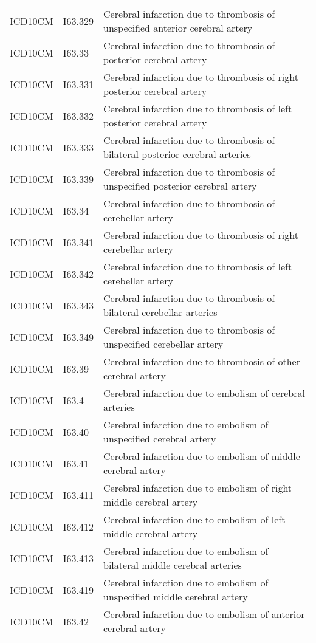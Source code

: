 \begin{longtable}{p{}p{}p{}}
  ICD10CM & I63.329 & Cerebral infarction due to thrombosis of unspecified anterior cerebral artery \\ 
  ICD10CM & I63.33 & Cerebral infarction due to thrombosis of posterior cerebral artery \\ 
  ICD10CM & I63.331 & Cerebral infarction due to thrombosis of right posterior cerebral artery \\ 
  ICD10CM & I63.332 & Cerebral infarction due to thrombosis of left posterior cerebral artery \\ 
  ICD10CM & I63.333 & Cerebral infarction due to thrombosis of bilateral posterior cerebral arteries \\ 
  ICD10CM & I63.339 & Cerebral infarction due to thrombosis of unspecified posterior cerebral artery \\ 
  ICD10CM & I63.34 & Cerebral infarction due to thrombosis of cerebellar artery \\ 
  ICD10CM & I63.341 & Cerebral infarction due to thrombosis of right cerebellar artery \\ 
  ICD10CM & I63.342 & Cerebral infarction due to thrombosis of left cerebellar artery \\ 
  ICD10CM & I63.343 & Cerebral infarction due to thrombosis of bilateral cerebellar arteries \\ 
  ICD10CM & I63.349 & Cerebral infarction due to thrombosis of unspecified cerebellar artery \\ 
  ICD10CM & I63.39 & Cerebral infarction due to thrombosis of other cerebral artery \\ 
  ICD10CM & I63.4 & Cerebral infarction due to embolism of cerebral arteries \\ 
  ICD10CM & I63.40 & Cerebral infarction due to embolism of unspecified cerebral artery \\ 
  ICD10CM & I63.41 & Cerebral infarction due to embolism of middle cerebral artery \\ 
  ICD10CM & I63.411 & Cerebral infarction due to embolism of right middle cerebral artery \\ 
  ICD10CM & I63.412 & Cerebral infarction due to embolism of left middle cerebral artery \\ 
  ICD10CM & I63.413 & Cerebral infarction due to embolism of bilateral middle cerebral arteries \\ 
  ICD10CM & I63.419 & Cerebral infarction due to embolism of unspecified middle cerebral artery \\ 
  ICD10CM & I63.42 & Cerebral infarction due to embolism of anterior cerebral artery \\ 

\end{longtable}
